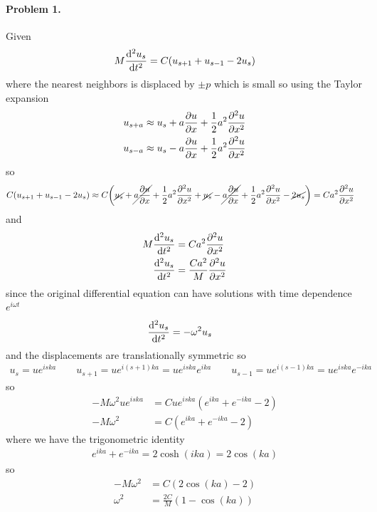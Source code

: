 \documentclass[../main.tex]{subfiles}
\begin{document}
\pagestyle{fancy}

\renewcommand\thefigure{\arabic{figure}} 

\paragraph*{Problem 1.} Given
\begin{align*}
    M \dv[2]{u_s}{t} = C (u_{s+1} + u_{s-1} - 2u_s)
\end{align*}
where the nearest neighbors is displaced by $\pm p$ which is small so using the Taylor expansion
\begin{align*}
    u_{s + a} &\approx u_s + a \pdv{u}{x} + \frac{1}{2} a^2 \pdv[2]{u}{x} \\
    u_{s - a} &\approx u_s - a \pdv{u}{x} + \frac{1}{2} a^2 \pdv[2]{u}{x}
\end{align*} 
so
\begin{align*}
    C (u_{s+1} + u_{s-1} - 2u_s) &\approx C \qt(\cancel{u_s} + \cancel{a\pdv{u}{x}} 
        + \frac{1}{2} a^2 \pdv[2]{u}{x} + \cancel{u_s} - \cancel{a\pdv{u}{x}} +
        \frac{1}{2} a^2 \pdv[2]{u}{x} - \cancel{2u_s})
    = C a^2 \pdv[2]{u}{x}
\end{align*}
and
\begin{align*}
    M \dv[2]{u_s}{t} &= C a^2 \pdv[2]{u}{x} \\
    \dv[2]{u_s}{t} &= \frac{C a^2}{M} \pdv[2]{u}{x}
\end{align*}
since the original differential equation can have solutions with time dependence $e^{i\omega t}$
\begin{align*}
    \dv[2]{u_s}{t} &= -\omega^2 u_s
\end{align*}
and the displacements are translationally symmetric so
\begin{align*}
    u_s = ue^{iska} \qquad u_{s + 1} = ue^{i(s+1)ka} = ue^{iska}e^{ika}
    \qquad u_{s - 1} = ue^{i(s-1)ka} = ue^{iska}e^{-ika}
\end{align*}
so
\begin{align*}
    -M \omega^2 ue^{iska} &= Cue^{iska}(e^{ika} + e^{-ika} - 2) \\
    -M \omega^2 &= C(e^{ika} + e^{-ika} - 2) 
\end{align*}
where we have the trigonometric identity
\begin{align*}
    e^{ika} + e^{-ika} = 2\cosh(ika) = 2\cos(ka)
\end{align*}
so 
\begin{align*}
    -M\omega^2 &= C(2\cos(ka) - 2) \\
    \omega^2 &= \frac{2C}{M}(1 - \cos(ka))
\end{align*}
\end{document}
